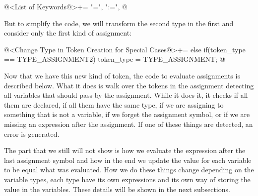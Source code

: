 \iniciocodigo
@<List of Keywords@>+=
"=", ":=",
@
\fimcodigo

But to simplify the code, we will transform the second type in the
first and consider only the first kind of assignment:

\iniciocodigo
@<Change Type in Token Creation for Special Cases@>+=
else if(token_type == TYPE_ASSIGNMENT2)
  token_type = TYPE_ASSIGNMENT;
@
\fimcodigo


Now that we have this new kind of token, the code to evaluate
assignments is described below. What it does is walk over the tokens
in the assignment detecting all variables that should pass by the
assignment. While it does it, it checks if all them are declared, if
all them have the same type, if we are assigning to something that is
not a variable, if we forget the assignment symbol, or if we are
missing an expression after the assignment. If one of these things are
detected, an error is generated.

The part that we still will not show is how we evaluate the expression
after the last assignment symbol and how in the end we update the
value for each variable to be equal what was evaluated. How we do
these things change depending on the variable types, each type have
its own expressions and its own way of storing the value in the
variables. These details will be shown in the next subsections.

